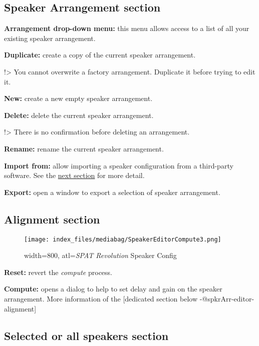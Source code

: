 \documentclass[
  letterpaper,
  DIV=11,
  numbers=noendperiod]{scrreport}
\begin{document}
\hypertarget{speaker-arrangement-section}{%
\subsection{Speaker Arrangement
section}\label{speaker-arrangement-section}}

\textbf{Arrangement drop-down menu:} this menu allows access to a list
of all your existing speaker arrangement.

\textbf{Duplicate:} create a copy of the current speaker arrangement.

!\textgreater{} You cannot overwrite a factory arrangement. Duplicate it
before trying to edit it.

\textbf{New:} create a new empty speaker arrangement.

\textbf{Delete:} delete the current speaker arrangement.

!\textgreater{} There is no confirmation before deleting an arrangement.

\textbf{Rename:} rename the current speaker arrangement.

\textbf{Import from:} allow importing a speaker configuration from a
third-party software. See the
\href{Spat_Environment_Import_Speaker_Config.md}{next section} for more
detail.

\textbf{Export:} open a window to export a selection of speaker
arrangement.

\hypertarget{alignment-section}{%
\subsection{Alignment section}\label{alignment-section}}

\begin{figure}

{\centering \texttt{[image: index\_files/mediabag/SpeakerEditorCompute3.png]}

}

\caption{width=800, atl=\emph{SPAT Revolution} Speaker Config}

\end{figure}

\textbf{Reset:} revert the \emph{compute} process.

\textbf{Compute:} opens a dialog to help to set delay and gain on the
speaker arrangement. More information of the {[}dedicated section below
-@spkrArr-editor-alignment{]}

\hypertarget{selected-or-all-speakers-section}{%
\subsection{Selected or all speakers
section}\label{selected-or-all-speakers-section}}
\end{document}
